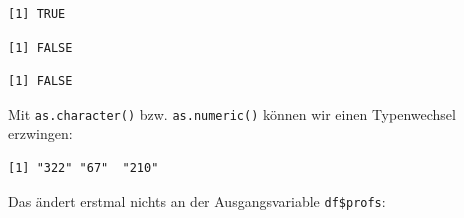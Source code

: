 \documentclass[
  letterpaper,
  DIV=11,
  numbers=noendperiod]{scrreprt}
\newenvironment{Shaded}{\begin{snugshade}}{\end{snugshade}}
\newcommand{\DocumentationTok}[1]{\textcolor[rgb]{0.37,0.37,0.37}{\textit{#1}}}
\newcommand{\FunctionTok}[1]{\textcolor[rgb]{0.28,0.35,0.67}{#1}}
\newcommand{\NormalTok}[1]{\textcolor[rgb]{0.00,0.46,0.62}{#1}}
\newcommand{\SpecialCharTok}[1]{\textcolor[rgb]{0.37,0.37,0.37}{#1}}
\begin{document}
\begin{Shaded}
\end{Shaded}

\begin{verbatim}
[1] TRUE
\end{verbatim}

\begin{Shaded}
\end{Shaded}

\begin{verbatim}
[1] FALSE
\end{verbatim}

\begin{Shaded}
\end{Shaded}

\begin{verbatim}
[1] FALSE
\end{verbatim}

Mit \texttt{as.character()} bzw. \texttt{as.numeric()} können wir einen
Typenwechsel erzwingen:

\begin{Shaded}
\end{Shaded}

\begin{verbatim}
[1] "322" "67"  "210"
\end{verbatim}

Das ändert erstmal nichts an der Ausgangsvariable \texttt{df\$profs}:

\begin{Shaded}
\end{Shaded}
\end{document}
